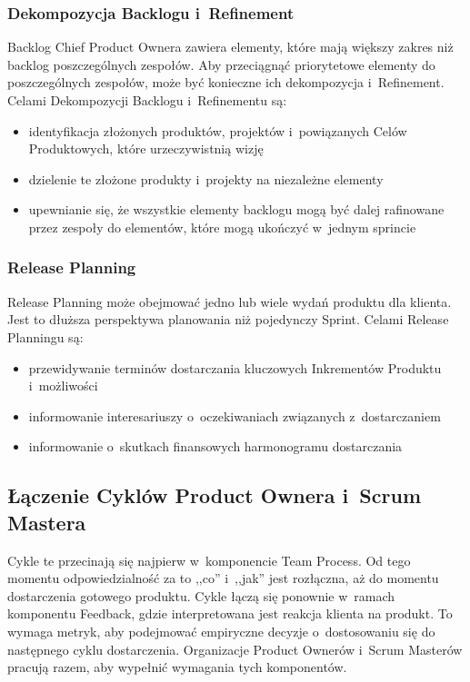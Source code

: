 \documentclass[12pt,a4paper,parskip=full]{scrartcl}
\begin{document}
\subsubsection{Dekompozycja Backlogu i~Refinement}\label{backlog-decomposition-and-refinement}

Backlog Chief Product Ownera zawiera elementy, które mają większy zakres niż backlog poszczególnych zespołów. Aby przeciągnąć priorytetowe elementy do poszczególnych zespołów, może być konieczne ich dekompozycja i~Refinement. Celami Dekompozycji Backlogu i~Refinementu są:

\begin{itemize}
\itemsep1pt\parskip0pt
\item
  identyfikacja złożonych produktów, projektów i~powiązanych Celów Produktowych, które urzeczywistnią wizję
\item
  dzielenie te złożone produkty i~projekty na niezależne elementy
\item
  upewnianie się, że wszystkie elementy backlogu mogą być dalej rafinowane przez zespoły do elementów, które mogą ukończyć w~jednym sprincie
\end{itemize}

\subsubsection{Release Planning}\label{Release-planning}

Release Planning może obejmować jedno lub wiele wydań produktu dla klienta. Jest to dłuższa perspektywa planowania niż pojedynczy Sprint. Celami Release Planningu są:

\begin{itemize}
\itemsep1pt\parskip0pt
\item
  przewidywanie terminów dostarczania kluczowych Inkrementów Produktu i~możliwości
\item
  informowanie interesariuszy o~oczekiwaniach związanych z~dostarczaniem
\item
  informowanie o~skutkach finansowych harmonogramu dostarczania
\end{itemize}

\subsection{Łączenie Cyklów Product Ownera i~Scrum Mastera}\label{Connecting-the-product-owner-and-scrum-master-cycles}

Cykle te przecinają się najpierw w~komponencie Team Process. Od tego momentu odpowiedzialność za to ,,co'' i~,,jak'' jest rozłączna, aż do momentu dostarczenia gotowego produktu. Cykle łączą się ponownie w~ramach komponentu Feedback, gdzie interpretowana jest reakcja klienta na produkt. To wymaga metryk, aby podejmować empiryczne decyzje o~dostosowaniu się do następnego cyklu dostarczenia. Organizacje Product Ownerów i~Scrum Masterów pracują razem, aby wypełnić wymagania tych komponentów.
\end{document}
